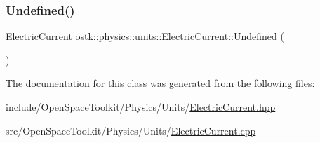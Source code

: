 \subsubsection{\texorpdfstring{Undefined()}{Undefined()}}
{\footnotesize\ttfamily \hyperlink{classostk_1_1physics_1_1units_1_1_electric_current}{Electric\+Current} ostk\+::physics\+::units\+::\+Electric\+Current\+::\+Undefined (\begin{DoxyParamCaption}{ }\end{DoxyParamCaption})\hspace{0.3cm}{\ttfamily [static]}}



The documentation for this class was generated from the following files\+:\begin{DoxyCompactItemize}
\item 
include/\+Open\+Space\+Toolkit/\+Physics/\+Units/\hyperlink{_electric_current_8hpp}{Electric\+Current.\+hpp}\item 
src/\+Open\+Space\+Toolkit/\+Physics/\+Units/\hyperlink{_electric_current_8cpp}{Electric\+Current.\+cpp}\end{DoxyCompactItemize}
